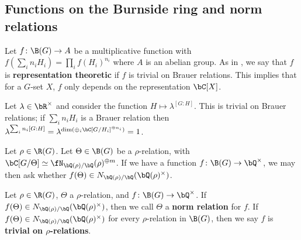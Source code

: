 \subsection{Functions on the Burnside ring and norm relations}\label{sec-norm-rels}

Let $f \colon \B(G) \to A$ be a multiplicative function with $f(\sum_i n_i H_i) = \prod_i f(H_i)^{n_i}$ where $A$ is an abelian group. As in \cite{reg-const}, we say that $f$ is \textbf{representation theoretic} if $f$ is trivial on Brauer relations. This implies that for a $G$-set $X$, $f$ only depends on the representation $\bC[X]$. 

\begin{example}
  Let $\lambda \in \bR^{\times}$ and consider the function $H \mapsto \lambda^{[G : H]}$. This is trivial on Brauer relations;  if $\sum_i n_i H_i$ is a Brauer relation then $\lambda^{\sum_i n_i [G : H]} = \lambda^{\dim( \oplus_i \bC[G / H_i]^{\oplus n_i})} = 1$.
\end{example}

Let $\rho \in \R(G)$. Let $\Theta \in \B(G)$ be a $\rho$-relation, with $\bC[G / \Theta] \simeq \repnorm{\rho}^{\oplus m}$. If we have a function $f \colon \B(G) \to \bQ^{\times}$, we may then ask whether $f(\Theta) \in \fieldnorm{\rho}$. 


\begin{defn}
Let $\rho \in \R(G)$, $\Theta$ a $\rho$-relation, and $f \colon \B(G) \to \bQ^{\times}$. If $f(\Theta) \in \fieldnorm{\rho}$, then we call $\Theta$ a \textbf{norm relation} for $f$. 
If $f(\Theta) \in \fieldnorm{\rho}$ for every $\rho$-relation in $\B(G)$, then we say $f$ is \textbf{trivial on $\rho$-relations}.

\end{defn}


